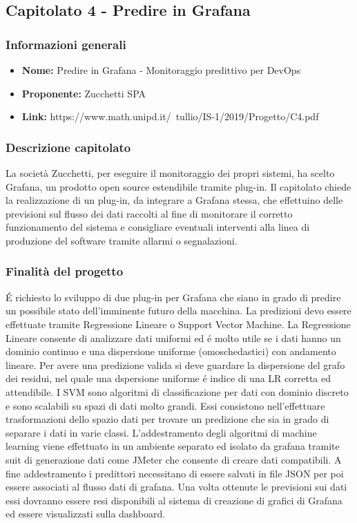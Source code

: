 
\subsection{Capitolato 4 - Predire in Grafana}

		\subsubsection{Informazioni generali}
			\begin{itemize} %
			  \item \textbf{Nome:} Predire in Grafana - Monitoraggio predittivo per DevOps
			  \item \textbf{Proponente:} Zucchetti SPA
			  \item \textbf{Link:} https://www.math.unipd.it/~tullio/IS-1/2019/Progetto/C4.pdf
			\end{itemize}

		\subsubsection{Descrizione capitolato}
			La società Zucchetti, per eseguire il monitoraggio dei propri sistemi, ha scelto Grafana, un prodotto open source estendibile tramite plug-in.
			Il capitolato chiede la realizzazione di un plug-in, da integrare a Grafana stessa, che effettuino delle previsioni sul flusso dei dati raccolti al fine di monitorare il corretto funzionamento del sistema e consigliare eventuali interventi alla linea di produzione del software tramite allarmi o segnalazioni.

		\subsubsection{Finalità del progetto}
			É richiesto lo sviluppo di due plug-in per Grafana che siano in grado di predire un possibile stato dell'imminente futuro della macchina. La predizioni devo essere effettuate tramite Regressione Lineare o Support Vector Machine.
			La Regressione Lineare consente di analizzare dati uniformi ed é molto utile se i dati hanno un dominio continuo e una dispersione uniforme (omoschedastici) con andamento lineare. Per avere una predizione valida si deve guardare la dispersione del grafo dei residui, nel quale una dspersione uniforme é indice di una LR corretta ed attendibile.
			I SVM sono algoritmi di classificazione per dati con dominio discreto e sono scalabili su spazi di dati molto grandi. Essi consistono nell'effettuare trasformazioni dello spazio dati per trovare un predizione che sia in grado di separare i dati in varie classi.
			L'addestramento degli algoritmi di machine learning viene effettuato in un ambiente separato ed isolato da grafana tramite suit di generazione dati come JMeter che consente di creare dati compatibili. A fine addestramento i predittori necessitano di essere salvati in file JSON per poi essere associati al flusso dati di grafana. Una volta ottenute le previsioni sui dati essi dovranno essere resi disponibili al sistema di creazione di grafici di Grafana ed essere visualizzati sulla dashboard.

